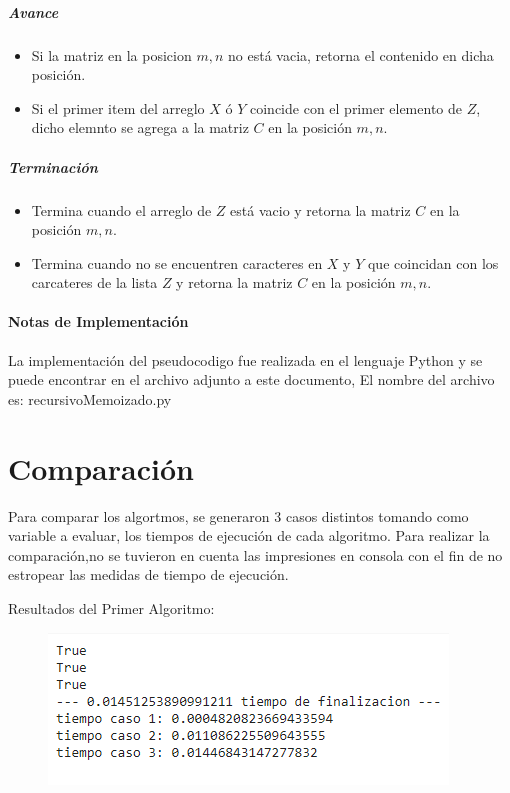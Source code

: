 \documentclass[]{article}
\numberwithin{equation}{section}
\numberwithin{figure}{section}
\theoremstyle{definition}
\begin{document}
	\subsubsection*{Avance}
	\begin{itemize}
	\item Si la matriz en la posicion $m,n$ no está vacia, retorna el contenido en dicha posición. 
	\item Si el primer item del arreglo $X$ ó $Y$ coincide con el primer elemento de $Z$, dicho elemnto se agrega a la matriz $C$ en la posición $m,n$.
	\end{itemize}
	\subsubsection*{Terminación}
	\begin{itemize}
	\item Termina cuando el arreglo de $Z$ está vacio y retorna la matriz $C$ en la posición $m,n$.
	\item Termina cuando no se encuentren caracteres en $X$ y $Y$ que coincidan con los carcateres de la lista $Z$ y retorna la matriz $C$ en la posición $m,n$.
	\end{itemize}
	
	\subsection*{Notas de Implementación}
	
	\text La implementación del pseudocodigo fue realizada en el lenguaje Python y se puede encontrar en el archivo adjunto a este documento, El nombre del archivo es: recursivoMemoizado.py	

\part*{Comparación}

\text Para comparar los algortmos, se generaron 3 casos distintos tomando como variable a evaluar, los tiempos de ejecución de cada algoritmo. Para realizar la comparación,no se tuvieron en cuenta las impresiones en consola con el fin de no estropear las medidas de tiempo de ejecución.

\text Resultados del Primer Algoritmo:

\begin{figure}[H]
	\includegraphics{Algoritmo 1}
    \centering
\end{figure}
\end{document}

